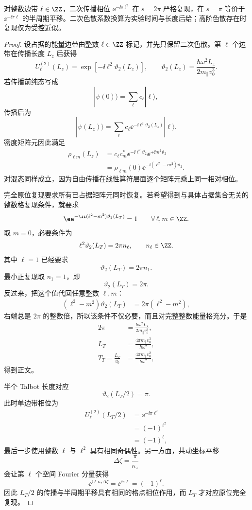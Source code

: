 \begin{proposition}[整数能量梳的二次相位复现]
对整数边带 $\ell\in\ZZ$，二次传播相位 $\ee^{-\ii s\ell^2}$ 在 $s=2\pi$ 严格复现，在 $s=\pi$ 等价于 $\ee^{-\ii\pi\ell}$ 的半周期平移。二次色散系数换算为实验时间与长度后给；高阶色散存在时复现仅为受控近似。
\end{proposition}
\begin{proof}
设占据的能量边带由整数 $\ell\in\ZZ$ 标记，并先只保留二次色散。第 $\ell$ 个边带在传播长度 $L_z$ 后获得
\[
U_\ell^{(2)}(L_z)
=\exp[-\ii\ell^2\vartheta_2(L_z)],
\qquad
\vartheta_2(L_z)=\frac{\hbar\omega^2L_z}{2m_\parallel v_0^3}.
\]
若传播前纯态写成
\[
|\psi(0)\rangle=\sum_\ell c_\ell|\ell\rangle,
\]
传播后为
\[
|\psi(L_z)\rangle
=\sum_\ell c_\ell
\ee^{-\ii\ell^2\vartheta_2(L_z)}|\ell\rangle.
\]
密度矩阵元因此满足
\begin{align*}
\rho_{\ell m}(L_z)
&=c_\ell c_m^*
\ee^{-\ii\ell^2\vartheta_2}
\ee^{+\ii m^2\vartheta_2}\\
&=\rho_{\ell m}(0)
\ee^{-\ii(\ell^2-m^2)\vartheta_2}.
\end{align*}
对混态同样成立，因为自由传播在线性算符层面逐个矩阵元乘上同一相对相位。

完全原位复现要求所有已占据矩阵元同时恢复。若希望得到与具体占据集合无关的整数格复现条件，就要求
\[
\ee^{-\ii(\ell^2-m^2)\vartheta_2(L_T)}=1
\qquad
\forall\,\ell,m\in\ZZ.
\]
取 $m=0$，必要条件为
\[
\ell^2\vartheta_2(L_T)=2\pi n_\ell,
\qquad n_\ell\in\ZZ.
\]
其中 $\ell=1$ 已经要求
\[
\vartheta_2(L_T)=2\pi n_1.
\]
最小正复现取 $n_1=1$，即
\[
\vartheta_2(L_T)=2\pi.
\]
反过来，把这个值代回任意整数 $\ell,m$：
\begin{align*}
(\ell^2-m^2)\vartheta_2(L_T)
&=2\pi(\ell^2-m^2),
\end{align*}
右端总是 $2\pi$ 的整数倍，所以该条件不仅必要，而且对完整整数能量格充分。于是
\begin{align*}
2\pi
&=\frac{\hbar\omega^2L_T}{2m_\parallel v_0^3},\\
L_T
&=\frac{4\pi m_\parallel v_0^3}{\hbar\omega^2},\\
T_T=\frac{L_T}{v_0}
&=\frac{4\pi m_\parallel v_0^2}{\hbar\omega^2},
\end{align*}
得到正文。

半个 Talbot 长度对应
\[
\vartheta_2(L_T/2)=\pi.
\]
此时单边带相位为
\begin{align*}
U_\ell^{(2)}(L_T/2)
&=\ee^{-\ii\pi\ell^2}\\
&=(-1)^{\ell^2}\\
&=(-1)^\ell,
\end{align*}
最后一步使用整数 $\ell$ 与 $\ell^2$ 具有相同奇偶性。另一方面，共动坐标平移
\[
\Delta\zeta=\frac{\pi}{\kappa_z}
\]
会让第 $\ell$ 个空间 Fourier 分量获得
\[
\ee^{\ii\ell\kappa_z\Delta\zeta}
=\ee^{\ii\pi\ell}=(-1)^\ell.
\]
因此 $L_T/2$ 的传播与半周期平移具有相同的格点相位作用，而 $L_T$ 才对应原位完全复现。
\end{proof}


